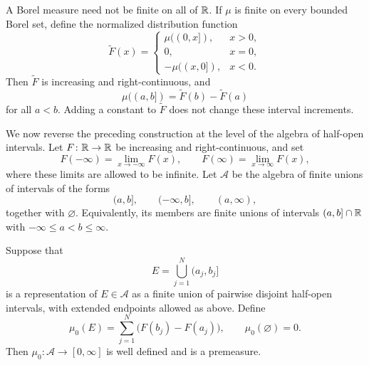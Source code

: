 \begin{remark}
  A Borel measure need not be finite on all of $\mathbb{R}$. If $\mu$ is
  finite on every bounded Borel set, define the normalized distribution
  function
  \[
    \widetilde F(x)
    =\begin{cases}
      \mu((0,x]),&x>0,\\
      0,&x=0,\\
      -\mu((x,0]),&x<0.
    \end{cases}
  \]
  Then $\widetilde F$ is increasing and right-continuous, and
  \[
    \mu((a,b])=\widetilde F(b)-\widetilde F(a)
  \]
  for all $a<b$. Adding a constant to $\widetilde F$ does not change
  these interval increments.
\end{remark}

We now reverse the preceding construction at the level of the algebra of
half-open intervals. Let $F\colon\mathbb{R}\to\mathbb{R}$ be increasing and
right-continuous, and set
\[
  F(-\infty)=\lim_{x\to-\infty}F(x),
  \qquad
  F(\infty)=\lim_{x\to\infty}F(x),
\]
where these limits are allowed to be infinite. Let $\mathcal A$ be the
algebra of finite unions of intervals of the forms
\[
  (a,b],\qquad (-\infty,b],\qquad (a,\infty),
\]
together with $\varnothing$. Equivalently, its members are finite unions
of intervals $(a,b]\cap\mathbb{R}$ with
$-\infty\leq a<b\leq\infty$.

\begin{proposition}
  \label{prop:lebesgue-stieltjes-premeasure-sep-08}
  Suppose that
  \[
    E=\bigcup_{j=1}^N(a_j,b_j]
  \]
  is a representation of $E\in\mathcal A$ as a finite union of pairwise
  disjoint half-open intervals, with extended endpoints allowed as
  above. Define
  \begin{equation}\label{eq:stieltjes-premeasure-sep-08}
    \mu_0(E)
    =\sum_{j=1}^N\bigl(F(b_j)-F(a_j)\bigr),
    \qquad
    \mu_0(\varnothing)=0.
  \end{equation}
  Then $\mu_0\colon\mathcal A\to[0,\infty]$ is well defined and is a
  premeasure.
\end{proposition}

